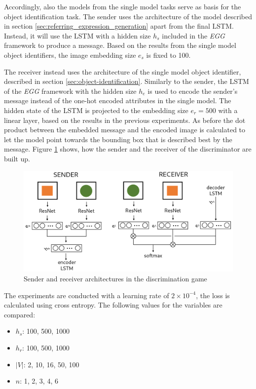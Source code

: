 Accordingly, also the models from the single model tasks serve as basis for the object identification task.
The sender uses the architecture of the model described in section \ref{sec:referring_expression_generation} apart from the final LSTM.
Instead, it will use the LSTM with a hidden size $h_s$ included in the \emph{EGG} framework to produce a message.
Based on the results from the single model object identifiers, the image embedding size $e_s$ is fixed to 100.

The receiver instead uses the architecture of the single model object identifier, described in section \ref{sec:object-identification}.
Similarly to the sender, the LSTM of the \emph{EGG} framework with the hidden size $h_e$ is used to encode the sender's message instead of the one-hot encoded attributes in the single model.
The hidden state of the LSTM is projected to the embedding size $e_r=500$ with a linear layer, based on the results in the previous experiments.
As before the dot product between the embedded message and the encoded image is calculated to let the model point towards the bounding box that is described best by the message.
Figure \ref{fig:discriminator_architecture} shows, how the sender and the receiver of the discriminator are built up.

\begin{figure}[ht]
    \centering
    \includegraphics[width=.8\linewidth]{figures/arch_discriminator.png}
    \caption{Sender and receiver architectures in the discrimination game}
    \label{fig:discriminator_architecture}
\end{figure}

The experiments are conducted with a learning rate of $2\times10^{-4}$, the loss is calculated using cross entropy.
The following values for the variables are compared:
\begin{itemize}
    \item $h_s$: 100, 500, 1000
    \item $h_r$: 100, 500, 1000
    \item $|V|$: 2, 10, 16, 50, 100
    \item $n$: 1, 2, 3, 4, 6
\end{itemize}


